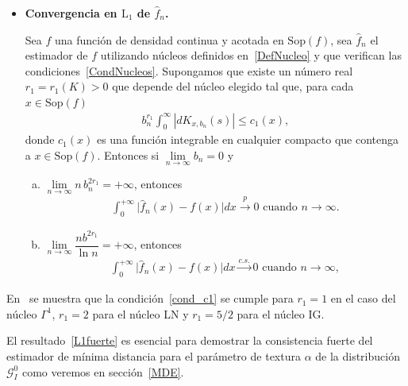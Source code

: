 \begin{itemize}
\item \textbf{Convergencia en $\text{L}_1$ de $\widehat{f}_n$.}

\begin{theorem}
	\label{ConvergenciaFuerte}
	\bigskip
	Sea $f$ una función de densidad continua y acotada en $\mathrm{Sop}(f)$, sea $\widehat{f}_{n}$ el estimador de $f$ utilizando núcleos definidos en~\ref{DefNucleo} y que verifican las condiciones~\ref{CondNucleos}. Supongamos que existe un número real $r_1=r_1(K)>0$ que depende del núcleo elegido tal que, para cada $x \in \mathrm{Sop}(f)$ 
	\begin{align}
	\label{cond_c1}
	b_n^{r_1} \displaystyle{\int_0^{\infty}} | dK_{x,b_n}(s) | \leq c_1(x),
	\end{align}
	donde $c_1(x)$ es una función integrable en cualquier compacto que contenga a $x \in \mathrm{Sop}(f)$. Entonces si $\lim\limits_{n \rightarrow \infty} b_n=0 $ y
	\begin{enumerate}[a)]
		\item $\lim\limits_{n \rightarrow \infty} n \, b_n^{2r_1}=+\infty$,  entonces
		\begin{align}
		\int_0^{+\infty} \vert \widehat{f}_n(x)-f(x)\vert dx \stackrel{p} {\longrightarrow} 0 \text{ cuando } n \longrightarrow \infty.
		\label{L1debil}
		\end{align}
		\item $\lim\limits_{n \to \infty} \dfrac{n b^{2r_1}}{\ln{n}}  = +\infty $, entonces 
		\begin{align}
		\int_0^{+\infty} \vert \widehat{f}_n(x)-f(x)\vert dx \stackrel{c.s.} {\longrightarrow} 0 \text{ cuando } n \longrightarrow \infty,
		\label{L1fuerte}
		\end{align}
	\end{enumerate}
\end{theorem}

\end{itemize}

En~\citet{Libnegue2013} se muestra que la condición~\ref{cond_c1} se cumple para $r_1=1$ en el caso del núcleo $\Gamma^1$, $r_1=2$ para el núcleo LN y $r_1=5/2$ para el núcleo IG.

El resultado~\ref{L1fuerte} es esencial para demostrar la consistencia fuerte del estimador de mínima distancia para el parámetro de textura $\alpha$ de la distribución $\mathcal{G}_I^0$ como veremos en sección~\ref{MDE}.

